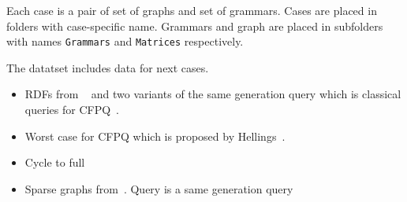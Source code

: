 Each case is a pair of set of graphs and set of grammars.
Cases are placed in folders with case-specific name.
Grammars and graph are placed in subfolders with names \verb|Grammars| and \verb|Matrices| respectively.

The datatset includes data for next cases.
\begin{itemize}
\item RDFs from ~\cite{!!!} and two variants of the same generation query which is classical queries for CFPQ~\cite{!!!}.
\item Worst case for CFPQ which is proposed by Hellings~\cite{!!!Hellings}.
\item Cycle to full
\item Sparse graphs from~\cite{fan2018scaling}. Query is a same generation query
\end{itemize}




